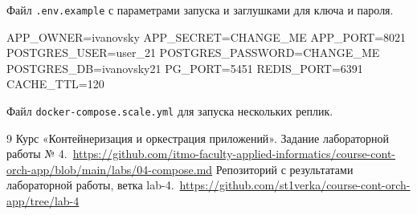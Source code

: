 Файл \texttt{.env.example} с параметрами запуска и заглушками для ключа и пароля.

\begin{code}
APP_OWNER=ivanovsky
APP_SECRET=CHANGE_ME
APP_PORT=8021
POSTGRES_USER=user_21
POSTGRES_PASSWORD=CHANGE_ME
POSTGRES_DB=ivanovsky21
PG_PORT=5451
REDIS_PORT=6391
CACHE_TTL=120
\end{code}

Файл \texttt{docker-compose.scale.yml} для запуска нескольких реплик.


\begin{thebibliography}{9}
 Курс «Контейнеризация и оркестрация приложений». Задание лабораторной работы № 4.\ \url{https://github.com/itmo-faculty-applied-informatics/course-cont-orch-app/blob/main/labs/04-compose.md}
 Репозиторий с результатами лабораторной работы, ветка lab-4.\ \url{https://github.com/st1verka/course-cont-orch-app/tree/lab-4}
\end{thebibliography}

